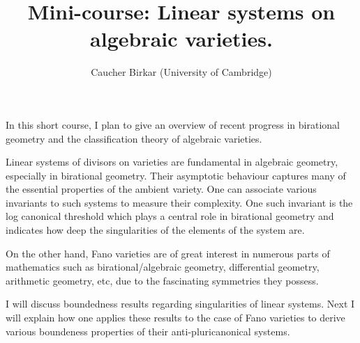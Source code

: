 \documentclass[12pt]{article}
\begin{document}
\title{Mini-course: Linear systems on algebraic varieties.}
\author{Caucher Birkar (University of Cambridge)}
\date{}

\maketitle

In this short course, I plan to give an overview of recent progress in birational geometry and the classification theory of algebraic varieties.

Linear systems of divisors on varieties are fundamental in algebraic geometry, especially in birational geometry. 
Their asymptotic behaviour captures many of the essential properties of the ambient variety. 
One can associate various invariants to such systems to measure their complexity. 
One such invariant is the log canonical threshold which plays a central role in birational geometry and indicates 
how deep the singularities of the elements of the system are.

On the other hand, Fano varieties are of great interest in numerous parts of mathematics such as birational/algebraic geometry, 
differential geometry, arithmetic geometry, etc, due to the fascinating symmetries they possess.

I will discuss boundedness results regarding singularities of linear systems. 
Next I will explain how one applies these results to the case of Fano varieties 
to derive various boundeness properties of their anti-pluricanonical systems.
\end{document}
